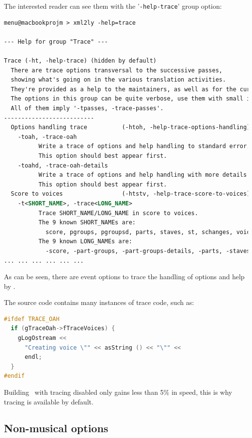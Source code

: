 \documentclass[12pt,a4paper]{article}
\begin{document}
The interested reader can see them with the '{\tt -help-trace}' group option:
\begin{lstlisting}[language=XML]
menu@macbookprojm > xml2ly -help=trace

--- Help for group "Trace" ---

Trace (-ht, -help-trace) (hidden by default)
  There are trace options transversal to the successive passes,
  showing what's going on in the various translation activities.
  They're provided as a help to the maintainers, as well as for the curious.
  The options in this group can be quite verbose, use them with small input data!
  All of them imply '-tpasses, -trace-passes'.
--------------------------
  Options handling trace          (-htoh, -help-trace-options-handling):
    -toah, -trace-oah
          Write a trace of options and help handling to standard error.
          This option should best appear first.
    -toahd, -trace-oah-details
          Write a trace of options and help handling with more details to standard error.
          This option should best appear first.
  Score to voices                 (-htstv, -help-trace-score-to-voices):
    -t<SHORT_NAME>, -trace<LONG_NAME>
          Trace SHORT_NAME/LONG_NAME in score to voices.
          The 9 known SHORT_NAMEs are:
            score, pgroups, pgroupsd, parts, staves, st, schanges, voices and voicesd.
          The 9 known LONG_NAMEs are:
            -score, -part-groups, -part-groups-details, -parts, -staves.
... ... ... ... ... ...
\end{lstlisting}

As can be seen, there are event options to trace the handling of options and help by \xmlToLy.

The source code contains many instances of trace code, such as:
\begin{lstlisting}[language=C++]
#ifdef TRACE_OAH
  if (gTraceOah->fTraceVoices) {
    gLogOstream <<
      "Creating voice \"" << asString () << "\"" <<
      endl;
  }
#endif
\end{lstlisting}

Building \xmlToLy\ with tracing disabled only gains less than 5\% in speed, this is why tracing is available by default.

\subsection{Non-musical options}
\end{document}
